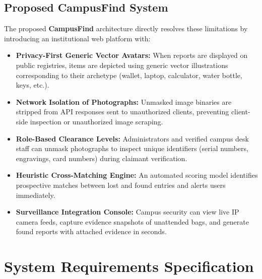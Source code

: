 \documentclass[11pt,a4paper]{article}
\begin{document}
\subsection{Proposed CampusFind System}
The proposed \textbf{CampusFind} architecture directly resolves these limitations by introducing an institutional web platform with:
\begin{itemize}
    \item \textbf{Privacy-First Generic Vector Avatars:} When reports are displayed on public registries, items are depicted using generic vector illustrations corresponding to their archetype (wallet, laptop, calculator, water bottle, keys, etc.).
    \item \textbf{Network Isolation of Photographs:} Unmasked image binaries are stripped from API responses sent to unauthorized clients, preventing client-side inspection or unauthorized image scraping.
    \item \textbf{Role-Based Clearance Levels:} Administrators and verified campus desk staff can unmask photographs to inspect unique identifiers (serial numbers, engravings, card numbers) during claimant verification.
    \item \textbf{Heuristic Cross-Matching Engine:} An automated scoring model identifies prospective matches between lost and found entries and alerts users immediately.
    \item \textbf{Surveillance Integration Console:} Campus security can view live IP camera feeds, capture evidence snapshots of unattended bags, and generate found reports with attached evidence in seconds.
\end{itemize}

\newpage

\section{System Requirements Specification}
\end{document}
